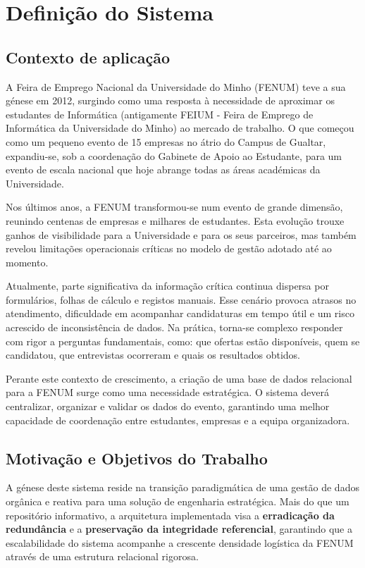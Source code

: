 \documentclass[12pt,a4paper]{article}
\begin{document}
\section{Definição do Sistema}

\subsection{Contexto de aplicação}

A Feira de Emprego Nacional da Universidade do Minho (FENUM) teve a sua génese
em 2012, surgindo como uma resposta à necessidade de aproximar os estudantes de
Informática (antigamente FEIUM - Feira de Emprego de Informática da Universidade
do Minho) ao mercado de trabalho. O que começou como um pequeno evento de 15
empresas no átrio do Campus de Gualtar, expandiu-se, sob a coordenação do
Gabinete de Apoio ao Estudante, para um evento de escala nacional que hoje
abrange todas as áreas académicas da Universidade.

Nos últimos anos, a FENUM transformou-se num evento de grande dimensão, reunindo
centenas de empresas e milhares de estudantes. Esta evolução trouxe ganhos de
visibilidade para a Universidade e para os seus parceiros, mas também revelou
limitações operacionais críticas no modelo de gestão adotado até ao momento.

Atualmente, parte significativa da informação crítica continua dispersa por
formulários, folhas de cálculo e registos manuais. Esse cenário provoca atrasos
no atendimento, dificuldade em acompanhar candidaturas em tempo útil e um risco
acrescido de inconsistência de dados. Na prática, torna-se complexo responder
com rigor a perguntas fundamentais, como: que ofertas estão disponíveis, quem se
candidatou, que entrevistas ocorreram e quais os resultados obtidos.

Perante este contexto de crescimento, a criação de uma base de dados relacional
para a FENUM surge como uma necessidade estratégica. O sistema deverá
centralizar, organizar e validar os dados do evento, garantindo uma melhor
capacidade de coordenação entre estudantes, empresas e a equipa organizadora.

\subsection{Motivação e Objetivos do Trabalho}
\noindent A génese deste sistema reside na transição paradigmática de uma gestão de dados orgânica e reativa para uma solução de engenharia estratégica. Mais do que um repositório informativo, a arquitetura implementada visa a \textbf{erradicação da redundância} e a \textbf{preservação da integridade referencial}, garantindo que a escalabilidade do sistema acompanhe a crescente densidade logística da FENUM através de uma estrutura relacional rigorosa.
\end{document}
